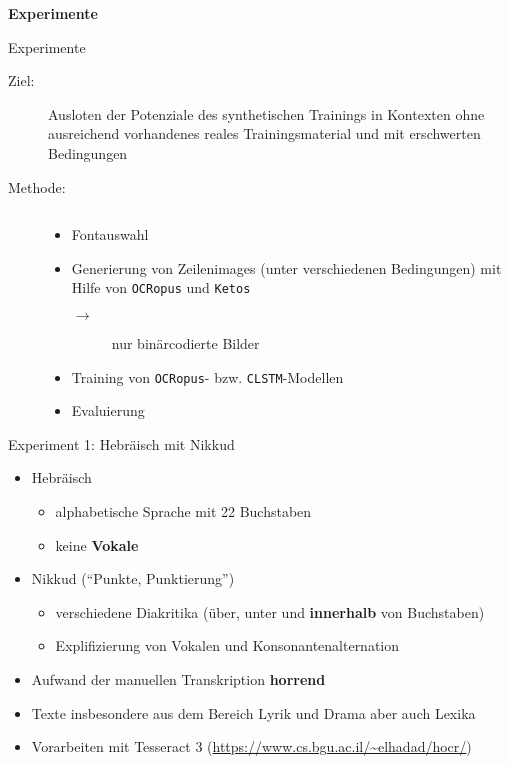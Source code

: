 \documentclass{bbawslides}
\begin{document}
\begin{bbawpart}{\Large\bf Experimente}
\end{bbawpart}

\begin{bbawslide}{Experimente}
  \vspace*{7mm}%
  \centerslidestrue%
  \begin{description}
    \item[Ziel:] Ausloten der Potenziale des synthetischen Trainings in Kontexten ohne ausreichend vorhandenes reales Trainingsmaterial und mit erschwerten Bedingungen
    \item[Methode:] $~$
      \begin{itemize}
        \item Fontauswahl
        \item Generierung von Zeilenimages (unter verschiedenen Bedingungen) mit Hilfe von \texttt{OCRopus} und \texttt{Ketos}
        \begin{description}
          \item[$\rightarrow$] nur binärcodierte Bilder
        \end{description}
        \item Training von \texttt{OCRopus}- bzw. \texttt{CLSTM}-Modellen
        \item Evaluierung
      \end{itemize}
  \end{description}
\end{bbawslide}

\begin{bbawslide}{Experiment 1: Hebräisch mit Nikkud}
  \vspace*{7mm}%
  \centerslidestrue%
  \begin{itemize}
    \item Hebräisch
    \begin{itemize}\small
      \item alphabetische Sprache mit 22 Buchstaben
      \item keine \textbf{Vokale}
    \end{itemize}
    \item Nikkud (\enquote{Punkte, Punktierung})
    \begin{itemize}\small
      \item verschiedene Diakritika (über, unter und \textbf{innerhalb} von Buchstaben)
      \item Explifizierung von Vokalen und Konsonantenalternation
    \end{itemize}
    \item Aufwand der manuellen Transkription \textbf{horrend}
    \item Texte insbesondere aus dem Bereich Lyrik und Drama aber auch Lexika
    \item Vorarbeiten mit Tesseract 3 (\url{https://www.cs.bgu.ac.il/~elhadad/hocr/})
  \end{itemize}
\end{bbawslide}
\end{document}

